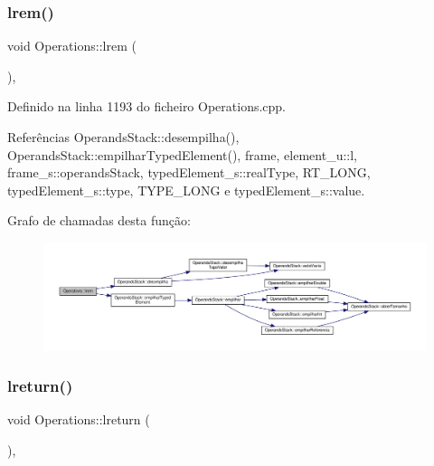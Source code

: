 \subsubsection{\texorpdfstring{lrem()}{lrem()}}
{\footnotesize\ttfamily void Operations\+::lrem (\begin{DoxyParamCaption}{ }\end{DoxyParamCaption})\hspace{0.3cm}{\ttfamily [static]}, {\ttfamily [private]}}



Definido na linha 1193 do ficheiro Operations.\+cpp.



Referências Operands\+Stack\+::desempilha(), Operands\+Stack\+::empilhar\+Typed\+Element(), frame, element\+\_\+u\+::l, frame\+\_\+s\+::operands\+Stack, typed\+Element\+\_\+s\+::real\+Type, R\+T\+\_\+\+L\+O\+NG, typed\+Element\+\_\+s\+::type, T\+Y\+P\+E\+\_\+\+L\+O\+NG e typed\+Element\+\_\+s\+::value.

Grafo de chamadas desta função\+:
\nopagebreak
\begin{figure}[H]
\begin{center}
\leavevmode
\includegraphics[width=350pt]{classOperations_a437e4b34f2f1be8982d36f0cdf47f98c_cgraph}
\end{center}
\end{figure}
\mbox{\label{classOperations_adbc4db2dbfcae7185bc9b7a005e988ea}} 
\subsubsection{\texorpdfstring{lreturn()}{lreturn()}}
{\footnotesize\ttfamily void Operations\+::lreturn (\begin{DoxyParamCaption}{ }\end{DoxyParamCaption})\hspace{0.3cm}{\ttfamily [static]}, {\ttfamily [private]}}



